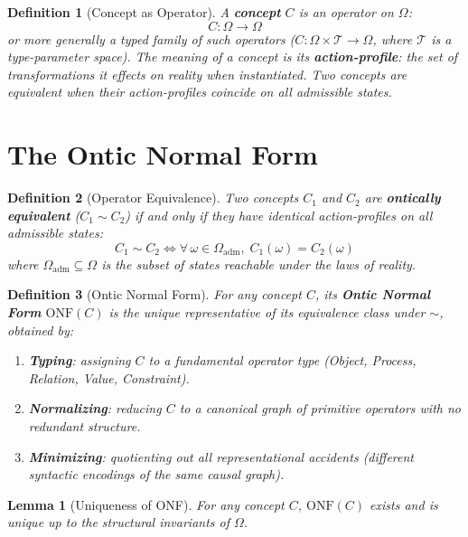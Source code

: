 \documentclass[12pt, letterpaper]{book}
\newtheorem{lemma}[theorem]{Lemma}
\newtheorem{definition}{Definition}[chapter]
\begin{document}
\begin{definition}[Concept as Operator]\label{def:concept-operator}
A \textbf{concept} $C$ is an operator on $\Omega$:
\[
C: \Omega \to \Omega
\]
or more generally a typed family of such operators ($C: \Omega \times \mathcal{T} \to \Omega$, where $\mathcal{T}$ is a type-parameter space). The meaning of a concept is its \textbf{action-profile}: the set of transformations it effects on reality when instantiated. Two concepts are equivalent when their action-profiles coincide on all admissible states.
\end{definition}

\section{The Ontic Normal Form}

\begin{definition}[Operator Equivalence]\label{def:op-equiv}
Two concepts $C_1$ and $C_2$ are \textbf{ontically equivalent} ($C_1 \sim C_2$) if and only if they have identical action-profiles on all admissible states:
\[
C_1 \sim C_2 \iff \forall\, \omega \in \Omega_{\mathrm{adm}},\; C_1(\omega) = C_2(\omega)
\]
where $\Omega_{\mathrm{adm}} \subseteq \Omega$ is the subset of states reachable under the laws of reality.
\end{definition}

\begin{definition}[Ontic Normal Form]\label{def:onf}
For any concept $C$, its \textbf{Ontic Normal Form} $\mathrm{ONF}(C)$ is the unique representative of its equivalence class under $\sim$, obtained by:
\begin{enumerate}[label=(\roman*)]
    \item \textbf{Typing}: assigning $C$ to a fundamental operator type (Object, Process, Relation, Value, Constraint).
    \item \textbf{Normalizing}: reducing $C$ to a canonical graph of primitive operators with no redundant structure.
    \item \textbf{Minimizing}: quotienting out all representational accidents (different syntactic encodings of the same causal graph).
\end{enumerate}
\end{definition}

\begin{lemma}[Uniqueness of ONF]\label{lem:onf-unique}
For any concept $C$, $\mathrm{ONF}(C)$ exists and is unique up to the structural invariants of $\Omega$.
\end{lemma}
\end{document}
